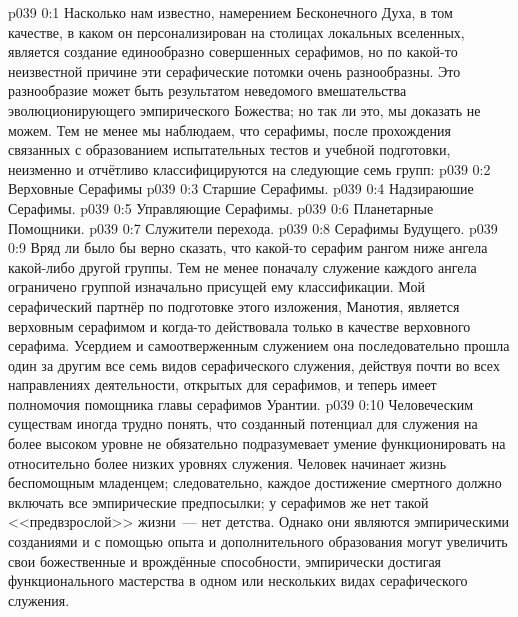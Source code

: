 \author{Мелхиседек}
\vs p039 0:1 Насколько нам известно, намерением Бесконечного Духа, в том качестве, в каком он персонализирован на столицах локальных вселенных, является создание единообразно совершенных серафимов, но по какой\hyp{}то неизвестной причине эти серафические потомки очень разнообразны. Это разнообразие может быть результатом неведомого вмешательства эволюционирующего эмпирического Божества; но так ли это, мы доказать не можем. Тем не менее мы наблюдаем, что серафимы, после прохождения связанных с образованием испытательных тестов и учебной подготовки, неизменно и отчётливо классифицируются на следующие семь групп:
\vs p039 0:2 Верховные Серафимы
\vs p039 0:3 Старшие Серафимы.
\vs p039 0:4 Надзираюшие Серафимы.
\vs p039 0:5 Управляющие Серафимы.
\vs p039 0:6 Планетарные Помощники.
\vs p039 0:7 Служители перехода.
\vs p039 0:8 Серафимы Будущего.
\vs p039 0:9 \pc Вряд ли было бы верно сказать, что какой\hyp{}то серафим рангом ниже ангела какой\hyp{}либо другой группы. Тем не менее поначалу служение каждого ангела ограничено группой изначально присущей ему классификации. Мой серафический партнёр по подготовке этого изложения, Манотия, является верховным серафимом и когда\hyp{}то действовала только в качестве верховного серафима. Усердием и самоотверженным служением она последовательно прошла один за другим все семь видов серафического служения, действуя почти во всех направлениях деятельности, открытых для серафимов, и теперь имеет полномочия помощника главы серафимов Урантии.
\vs p039 0:10 Человеческим существам иногда трудно понять, что созданный потенциал для служения на более высоком уровне не обязательно подразумевает умение функционировать на относительно более низких уровнях служения. Человек начинает жизнь беспомощным младенцем; следовательно, каждое достижение смертного должно включать все эмпирические предпосылки; у серафимов же нет такой <<предвзрослой>> жизни~--- нет детства. Однако они являются эмпирическими созданиями и с помощью опыта и дополнительного образования могут увеличить свои божественные и врождённые способности, эмпирически достигая функционального мастерства в одном или нескольких видах серафического служения.
